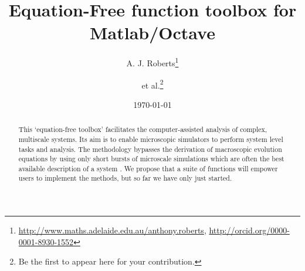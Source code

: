 \documentclass[11pt,a5paper]{article}
\title{Equation-Free function toolbox for Matlab/Octave}
\author{A. J. Roberts\thanks{%
\url{http://www.maths.adelaide.edu.au/anthony.roberts},
\url{http://orcid.org/0000-0001-8930-1552}}
\and et al.\thanks{Be the first to appear here for your contribution.}}
\date{\today}
\begin{document}
\maketitle

\begin{abstract}
This `equation-free toolbox' facilitates the computer-assisted analysis of complex, multiscale systems.
Its aim is to enable microscopic simulators to perform system level tasks and analysis.
The methodology bypasses the derivation of macroscopic evolution equations by using only short bursts of microscale simulations which are often the best available description of a system
\cite[e.g.]{Kevrekidis09a, Kevrekidis04a, Kevrekidis03b}.
We propose that a suite of functions will empower users to implement the methods, but so far we have only just started.
\end{abstract}

\tableofcontents







%

\appendix



\end{document}
